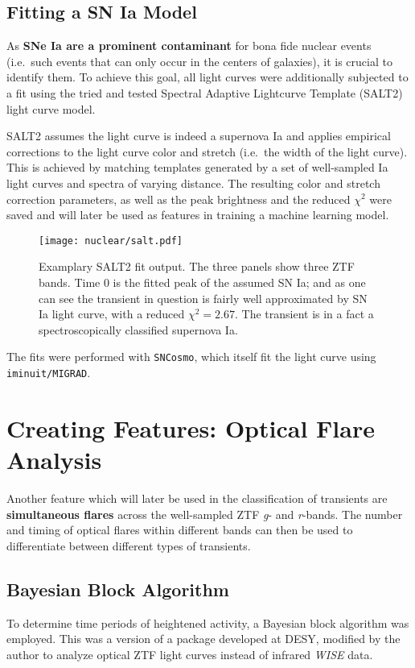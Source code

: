 \subsection{Fitting a SN Ia Model}\label{salt}
As \textbf{SNe Ia are a prominent contaminant} for bona fide nuclear events (i.e.~such events that can only occur in the centers of galaxies), it is crucial to identify them. To achieve this goal, all light curves were additionally subjected to a fit using the tried and tested Spectral Adaptive Lightcurve Template (SALT2)~ light curve model.

SALT2 assumes the light curve is indeed a supernova Ia and applies empirical corrections to the light curve color and stretch (i.e.~the width of the light curve). This is achieved by matching templates generated by a set of well-sampled Ia light curves and spectra of varying distance. The resulting color and stretch correction parameters, as well as the peak brightness and the reduced $\chi^2$ were saved and will later be used as features in training a machine learning model.

\begin{figure}[H]
    \texttt{[image: nuclear/salt.pdf]}
    \caption[SALT2 Fit]{Examplary SALT2 fit output. The three panels show three ZTF bands. Time 0 is the fitted peak of the assumed SN Ia; and as one can see the transient in question is fairly well approximated by SN Ia light curve, with a reduced  $\chi^2=2.67$. The transient is in a fact a spectroscopically classified supernova Ia.}
\end{figure}

The fits were performed with \texttt{SNCosmo}, which itself fit the light curve using \texttt{iminuit/MIGRAD}.

\section{Creating Features: Optical Flare Analysis}\label{bayesian_blocks}
Another feature which will later be used in the classification of transients are \textbf{simultaneous flares} across the well-sampled ZTF \textit{g}- and \textit{r}-bands. The number and timing of optical flares within different bands can then be used to differentiate between different types of transients.

\subsection{Bayesian Block Algorithm}
To determine time periods of heightened activity, a Bayesian block algorithm was employed. This was a version of a package developed at DESY, modified by the author to analyze optical ZTF light curves instead of infrared \textit{WISE} data.

